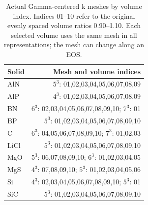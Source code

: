 \begin{table}[t]
\centering
\small
\caption{Actual Gamma-centered k meshes by volume index. Indices 01--10 refer to the original evenly spaced volume ratios 0.90--1.10. Each selected volume uses the same mesh in all representations; the mesh can change along an EOS.}
\label{tab:actual-k-meshes}
\begin{tabular}{lr}
\toprule
Solid & Mesh and volume indices \\
\midrule
AlN & $5^3$: 01,02,03,04,05,06,07,08,09 \\
AlP & $4^3$: 01,02,03,04,05,06,07,08,09 \\
BN & $6^3$: 02,03,04,05,06,07,08,09,10; $7^3$: 01 \\
BP & $5^3$: 01,02,03,04,05,06,07,08,09,10 \\
C & $6^3$: 04,05,06,07,08,09,10; $7^3$: 01,02,03 \\
LiCl & $5^3$: 01,02,03,04,05,06,07,08,09,10 \\
MgO & $5^3$: 06,07,08,09,10; $6^3$: 01,02,03,04,05 \\
MgS & $4^3$: 07,08,09,10; $5^3$: 01,02,03,04,05,06 \\
Si & $4^3$: 02,03,04,05,06,07,08,09,10; $5^3$: 01 \\
SiC & $5^3$: 01,02,03,04,05,06,07,08,09,10 \\
\bottomrule
\end{tabular}
\end{table}
